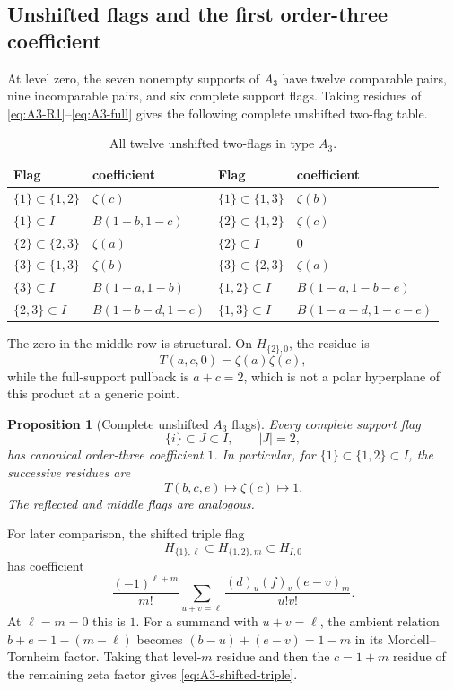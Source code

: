 \documentclass[11pt]{article}
\newtheorem{proposition}[theorem]{Proposition}
\renewcommand{\boxed}[1]{#1}
\begin{document}
\subsection{Unshifted flags and the first order-three coefficient}

At level zero, the seven nonempty supports of \(A_3\) have twelve
comparable pairs, nine incomparable pairs, and six complete support
flags.  Taking residues of
\eqref{eq:A3-R1}--\eqref{eq:A3-full} gives the following complete
unshifted two-flag table.

\begin{table}[ht]
\centering
\small
\begin{tabular}{@{}ll@{\qquad}ll@{}}
\toprule
Flag & coefficient & Flag & coefficient\\
\midrule
\(\{1\}\subset\{1,2\}\)&\(\zeta(c)\)&
\(\{1\}\subset\{1,3\}\)&\(\zeta(b)\)\\
\(\{1\}\subset I\)&\(B(1-b,1-c)\)&
\(\{2\}\subset\{1,2\}\)&\(\zeta(c)\)\\
\(\{2\}\subset\{2,3\}\)&\(\zeta(a)\)&
\(\{2\}\subset I\)&\(0\)\\
\(\{3\}\subset\{1,3\}\)&\(\zeta(b)\)&
\(\{3\}\subset\{2,3\}\)&\(\zeta(a)\)\\
\(\{3\}\subset I\)&\(B(1-a,1-b)\)&
\(\{1,2\}\subset I\)&\(B(1-a,1-b-e)\)\\
\(\{2,3\}\subset I\)&\(B(1-b-d,1-c)\)&
\(\{1,3\}\subset I\)&\(B(1-a-d,1-c-e)\)\\
\bottomrule
\end{tabular}
\caption{All twelve unshifted two-flags in type \(A_3\).}
\label{tab:A3-flags}
\end{table}

The zero in the middle row is structural.  On \(H_{\{2\},0}\), the
residue is
\[
 T(a,c,0)=\zeta(a)\zeta(c),
\]
while the full-support pullback is \(a+c=2\), which is not a polar
hyperplane of this product at a generic point.

\begin{proposition}[Complete unshifted \(A_3\) flags]
\label{prop:A3-complete-flags}
Every complete support flag
\[
 \{i\}\subset J\subset I,
 \qquad |J|=2,
\]
has canonical order-three coefficient \(1\).  In particular, for
\(\{1\}\subset\{1,2\}\subset I\), the successive residues are
\[
 T(b,c,e)\longmapsto\zeta(c)\longmapsto1.
\]
The reflected and middle flags are analogous.
\end{proposition}

For later comparison, the shifted triple flag
\[
 H_{\{1\},\ell}\subset H_{\{1,2\},m}\subset H_{I,0}
\]
has coefficient
\begin{equation}\label{eq:A3-shifted-triple}
 \boxed{
 \frac{(-1)^{\ell+m}}{m!}
 \sum_{u+v=\ell}
 \frac{(d)_u(f)_v(e-v)_m}{u!v!}.}
\end{equation}
At \(\ell=m=0\) this is \(1\).  For a summand with \(u+v=\ell\), the ambient relation
\(b+e=1-(m-\ell)\) becomes
\((b-u)+(e-v)=1-m\) in its Mordell--Tornheim factor.  Taking that
level-\(m\) residue and then the \(c=1+m\) residue of the remaining zeta
factor gives \eqref{eq:A3-shifted-triple}.
\end{document}
